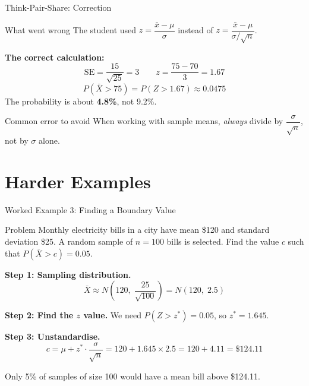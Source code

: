 \documentclass[aspectratio=169]{beamer}
\begin{document}
\begin{frame}{Think-Pair-Share: Correction}
    \begin{block}{What went wrong}
        The student used $z = \dfrac{\bar{x} - \mu}{\sigma}$ instead of
        $z = \dfrac{\bar{x} - \mu}{\sigma / \sqrt{n}}$.
    \end{block}

    \textbf{The correct calculation:}
    \[
        \text{SE} = \frac{15}{\sqrt{25}} = 3 \qquad
        z = \frac{75 - 70}{3} = 1.67
    \]
    \[
        P(\bar{X} > 75) = P(Z > 1.67) \approx 0.0475
    \]
    \medskip
    The probability is about \textbf{4.8\%}, not 9.2\%.

    \begin{alertblock}{Common error to avoid}
        When working with sample means, \emph{always} divide by
        $\dfrac{\sigma}{\sqrt{n}}$, not by $\sigma$ alone.
    \end{alertblock}
\end{frame}

\section{Harder Examples}

\begin{frame}{Worked Example 3: Finding a Boundary Value}
    \begin{exampleblock}{Problem}
        Monthly electricity bills in a city have mean \$120 and standard deviation \$25.
        A random sample of $n = 100$ bills is selected.
        Find the value $c$ such that $P(\bar{X} > c) = 0.05$.
    \end{exampleblock}

    \textbf{Step 1: Sampling distribution.}
    \[
        \bar{X} \approx N\!\left(120,\; \frac{25}{\sqrt{100}}\right) = N(120,\; 2.5)
    \]

    \textbf{Step 2: Find the $z$ value.} We need $P(Z > z^*) = 0.05$, so $z^* = 1.645$.

    \textbf{Step 3: Unstandardise.}
    \[
        c = \mu + z^* \cdot \frac{\sigma}{\sqrt{n}} = 120 + 1.645 \times 2.5 = 120 + 4.11 = \mathbf{\$124.11}
    \]

    \medskip
    Only 5\% of samples of size 100 would have a mean bill above \$124.11.
\end{frame}
\end{document}
